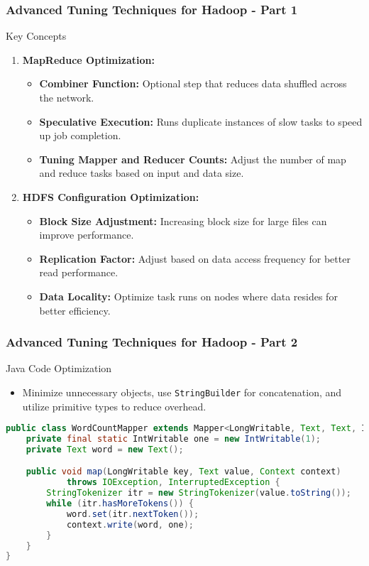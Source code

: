 \documentclass[aspectratio=169]{beamer}
\begin{document}
\begin{frame}[fragile]
    \frametitle{Advanced Tuning Techniques for Hadoop - Part 1}
    \begin{block}{Key Concepts}
        \begin{enumerate}
            \item \textbf{MapReduce Optimization:}
                \begin{itemize}
                    \item \textbf{Combiner Function:} Optional step that reduces data shuffled across the network.
                    \item \textbf{Speculative Execution:} Runs duplicate instances of slow tasks to speed up job completion.
                    \item \textbf{Tuning Mapper and Reducer Counts:} Adjust the number of map and reduce tasks based on input and data size.
                \end{itemize}
            \item \textbf{HDFS Configuration Optimization:}
                \begin{itemize}
                    \item \textbf{Block Size Adjustment:} Increasing block size for large files can improve performance.
                    \item \textbf{Replication Factor:} Adjust based on data access frequency for better read performance.
                    \item \textbf{Data Locality:} Optimize task runs on nodes where data resides for better efficiency.
                \end{itemize}
        \end{enumerate}
    \end{block}
\end{frame}

\begin{frame}[fragile]
    \frametitle{Advanced Tuning Techniques for Hadoop - Part 2}
    \begin{block}{Java Code Optimization}
        \begin{itemize}
            \item Minimize unnecessary objects, use \texttt{StringBuilder} for concatenation, and utilize primitive types to reduce overhead.
        \end{itemize}
        \begin{lstlisting}[language=Java]
public class WordCountMapper extends Mapper<LongWritable, Text, Text, IntWritable> {
    private final static IntWritable one = new IntWritable(1);
    private Text word = new Text();

    public void map(LongWritable key, Text value, Context context) 
            throws IOException, InterruptedException {
        StringTokenizer itr = new StringTokenizer(value.toString());
        while (itr.hasMoreTokens()) {
            word.set(itr.nextToken());
            context.write(word, one);
        }
    }
}
        \end{lstlisting}
    \end{block}
\end{frame}
\end{document}
